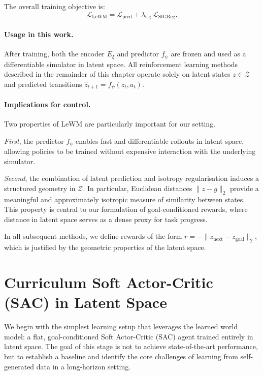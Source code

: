 The overall training objective is:
\begin{equation}
\mathcal{L}_{\mathrm{LeWM}}
= \mathcal{L}_{\mathrm{pred}} + \lambda_{\mathrm{sig}} \,
\mathcal{L}_{\mathrm{SIGReg}}.
\label{eq:lewm-total-clean}
\end{equation}

\paragraph{Usage in this work.}
After training, both the encoder $E_\xi$ and predictor $f_\psi$ are frozen
and used as a differentiable simulator in latent space. All reinforcement
learning methods described in the remainder of this chapter operate solely
on latent states $z \in \mathcal{Z}$ and predicted transitions
$\hat{z}_{t+1} = f_\psi(z_t, a_t)$.

\paragraph{Implications for control.}
Two properties of LeWM are particularly important for our setting.

\emph{First}, the predictor $f_\psi$ enables fast and differentiable
rollouts in latent space, allowing policies to be trained without
expensive interaction with the underlying simulator.

\emph{Second}, the combination of latent prediction and isotropy
regularisation induces a structured geometry in $\mathcal{Z}$. In
particular, Euclidean distances $\|z - g\|_2$ provide a meaningful and
approximately isotropic measure of similarity between states. This
property is central to our formulation of goal-conditioned rewards, where
distance in latent space serves as a dense proxy for task progress.

In all subsequent methods, we define rewards of the form
$r = -\|z_{\text{next}} - z_{\text{goal}}\|_2$,
which is justified by the geometric properties of the latent space.

\section{Curriculum Soft Actor-Critic (SAC) in Latent Space}
\label{sec:curr-sac}

We begin with the simplest learning setup that leverages the learned
world model: a flat, goal-conditioned Soft Actor-Critic (SAC) agent
trained entirely in latent space. The goal of this stage is not to
achieve state-of-the-art performance, but to establish a baseline and
identify the core challenges of learning from self-generated data in a
long-horizon setting.

